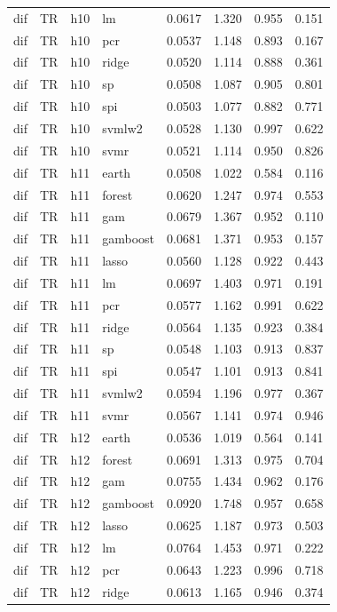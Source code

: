 \begin{ThreePartTable}
\begin{longtable}[t]{llclcccc}
dif & TR & h10 & lm & 0.0617 & 1.320 & 0.955 & 0.151\\
dif & TR & h10 & pcr & 0.0537 & 1.148 & 0.893 & 0.167\\
dif & TR & h10 & ridge & 0.0520 & 1.114 & 0.888 & 0.361\\
dif & TR & h10 & sp & 0.0508 & 1.087 & 0.905 & 0.801\\
dif & TR & h10 & spi & 0.0503 & 1.077 & 0.882 & 0.771\\
dif & TR & h10 & svmlw2 & 0.0528 & 1.130 & 0.997 & 0.622\\
dif & TR & h10 & svmr & 0.0521 & 1.114 & 0.950 & 0.826\\
\addlinespace
dif & TR & h11 & earth & 0.0508 & 1.022 & 0.584 & 0.116\\
dif & TR & h11 & forest & 0.0620 & 1.247 & 0.974 & 0.553\\
dif & TR & h11 & gam & 0.0679 & 1.367 & 0.952 & 0.110\\
dif & TR & h11 & gamboost & 0.0681 & 1.371 & 0.953 & 0.157\\
dif & TR & h11 & lasso & 0.0560 & 1.128 & 0.922 & 0.443\\
dif & TR & h11 & lm & 0.0697 & 1.403 & 0.971 & 0.191\\
dif & TR & h11 & pcr & 0.0577 & 1.162 & 0.991 & 0.622\\
dif & TR & h11 & ridge & 0.0564 & 1.135 & 0.923 & 0.384\\
dif & TR & h11 & sp & 0.0548 & 1.103 & 0.913 & 0.837\\
dif & TR & h11 & spi & 0.0547 & 1.101 & 0.913 & 0.841\\
dif & TR & h11 & svmlw2 & 0.0594 & 1.196 & 0.977 & 0.367\\
dif & TR & h11 & svmr & 0.0567 & 1.141 & 0.974 & 0.946\\
\addlinespace
dif & TR & h12 & earth & 0.0536 & 1.019 & 0.564 & 0.141\\
dif & TR & h12 & forest & 0.0691 & 1.313 & 0.975 & 0.704\\
dif & TR & h12 & gam & 0.0755 & 1.434 & 0.962 & 0.176\\
dif & TR & h12 & gamboost & 0.0920 & 1.748 & 0.957 & 0.658\\
dif & TR & h12 & lasso & 0.0625 & 1.187 & 0.973 & 0.503\\
dif & TR & h12 & lm & 0.0764 & 1.453 & 0.971 & 0.222\\
dif & TR & h12 & pcr & 0.0643 & 1.223 & 0.996 & 0.718\\
dif & TR & h12 & ridge & 0.0613 & 1.165 & 0.946 & 0.374\\

\end{longtable}
\end{ThreePartTable}
